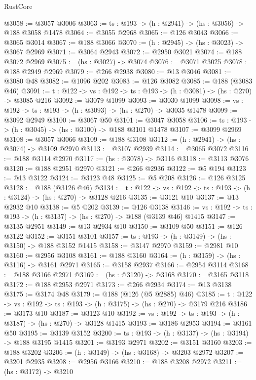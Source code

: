 \begin{lexlean}{RustCore}
\begin{coremodule}
@3058 := @3057 @3006
@3063 := {ts : @193} -> (h : @2941) -> (hs : @3056) -> @188 @3058 @1478
@3064 := @3055 @2968
@3065 := @126 @3043
@3066 := @3065 @3014
@3067 := @188 @3066
@3070 := (h : @2945) -> (hs : @3023) -> @3067 @2969
@3071 := @3064 @2943
@3072 := @2950 @3021
@3074 := @188 @3072 @2969
@3075 := (hs : @3027) -> @3074
@3076 := @3071 @3025
@3078 := @188 @2949 @2969
@3079 := @266 @2938
@3080 := @13 @3046
@3081 := @3080 @48
@3082 := @1096 @202
@3083 := @126 @3082
@3085 := @188 (@3083 @46)
@3091 := {t : @122} -> {vs : @192} -> {ts : @193} -> (h : @3081) -> (hs : @270) -> @3085 @216
@3092 := @3079 @1099
@3093 := @3030 @1099
@3098 := {vs : @192} -> {ts : @193} -> (h : @3093) -> (hs : @270) -> @3035 @1478
@3099 := @3092 @2949
@3100 := @3067 @50
@3101 := @3047 @3058
@3106 := {ts : @193} -> (h : @3045) -> (hs : @3100) -> @188 @3101 @1478
@3107 := @3099 @2969
@3108 := @3057 @3066
@3109 := @188 @3108
@3112 := (h : @2941) -> (hs : @3074) -> @3109 @2970
@3113 := @3107 @2939
@3114 := @3065 @3072
@3116 := @188 @3114 @2970
@3117 := (hs : @3078) -> @3116
@3118 := @3113 @3076
@3120 := @188 @2951 @2970
@3121 := @266 @2936
@3122 := @5 @194
@3123 := @13 @3122
@3124 := @3123 @48
@3125 := @5 @208
@3126 := @126 @3125
@3128 := @188 (@3126 @46)
@3134 := {t : @122} -> {vs : @192} -> {ts : @193} -> (h : @3124) -> (hs : @270) -> @3128 @216
@3135 := @3121 @10
@3137 := @13 @2932 @10
@3138 := @5 @202
@3139 := @126 @3138
@3146 := {vs : @192} -> {ts : @193} -> (h : @3137) -> (hs : @270) -> @188 (@3139 @46) @1415
@3147 := @3135 @2951
@3149 := @13 @2934 @10
@3150 := @3109 @50
@3151 := @126 @3122
@3152 := @3151 @3101
@3157 := {ts : @193} -> (h : @3149) -> (hs : @3150) -> @188 @3152 @1415
@3158 := @3147 @2970
@3159 := @2981 @10
@3160 := @2956 @3108
@3161 := @188 @3160
@3164 := (h : @3159) -> (hs : @3116) -> @3161 @2971
@3165 := @3158 @2937
@3166 := @2954 @3114
@3168 := @188 @3166 @2971
@3169 := (hs : @3120) -> @3168
@3170 := @3165 @3118
@3172 := @188 @2953 @2971
@3173 := @266 @2934
@3174 := @13 @3138
@3175 := @3174 @48
@3179 := @188 (@126 (@5 @2885) @46)
@3185 := {t : @122} -> {vs : @192} -> {ts : @193} -> (h : @3175) -> (hs : @270) -> @3179 @216
@3186 := @3173 @10
@3187 := @3123 @10
@3192 := {vs : @192} -> {ts : @193} -> (h : @3187) -> (hs : @270) -> @3128 @1415
@3193 := @3186 @2953
@3194 := @3161 @50
@3195 := @3139 @3152
@3200 := {ts : @193} -> (h : @3137) -> (hs : @3194) -> @188 @3195 @1415
@3201 := @3193 @2971
@3202 := @3151 @3160
@3203 := @188 @3202
@3206 := (h : @3149) -> (hs : @3168) -> @3203 @2972
@3207 := @3201 @2935
@3208 := @2956 @3166
@3210 := @188 @3208 @2972
@3211 := (hs : @3172) -> @3210

\end{coremodule}
\end{lexlean}
